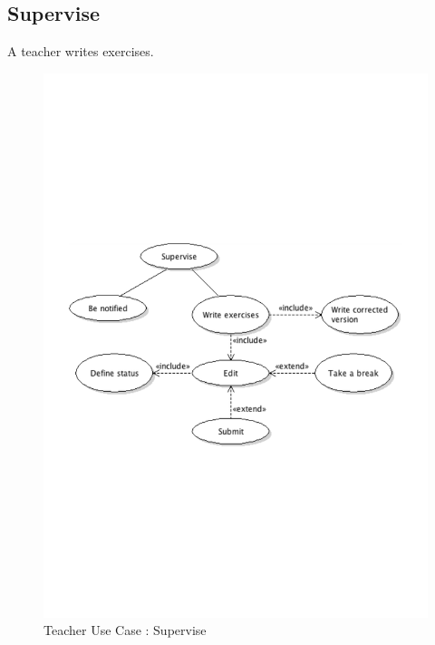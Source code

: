 	\subsection{Supervise}
		A teacher writes exercises.
		\begin{figure}[ht]
			\begin{center}
				\includegraphics[width=\textwidth,  trim=2cm 10cm 2cm 9cm]{UML_figure/UC/teacher/UC_Teacher_Supervise.pdf}
				\caption{Teacher Use Case : Supervise}
			\end{center}
		\end{figure}
	\newpage
